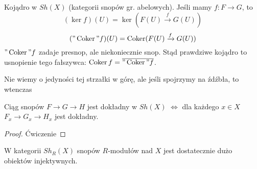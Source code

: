Kojądro w $Sh(X)$ (kategorii snopów gr. abelowych). Jeśli mamy $f:F\to G$, to 
$$(\ker f)(U)=\ker(F(U)\xrightarrow{f}G(U))$$
$$("\operatorname{Coker}" f)(U)=\operatorname{Coker}(F(U)\xrightarrow{f}G(U))$$
$"\operatorname{Coker}" f$ zadaje presnop, ale niekoniecznie snop. Stąd prawdziwe kojądro to usnopienie tego fałszywca: $\operatorname{Coker} f=\overline{"\operatorname{Coker}"f}$.

\begin{center}\end{center}

Nie wiemy o jedyności tej strzałki w górę, ale jeśli spojrzymy na źdźbła, to wtenczas
\begin{center}\end{center}

\begin{uwaga}
  Ciąg snopów $F\to G\to H$ jest dokładny w $Sh(X)$ $\iff$ dla każdego $x\in X$ $F_x\to G_x\to H_x$ jest dokładny.
\end{uwaga}

\begin{proof}Ćwiczenie\end{proof}

\begin{fact}
  W kategorii $Sh_R(X)$ snopów $R$-modułów nad $X$ jest dostatecznie dużo obiektów injektywnych.
\end{fact}

